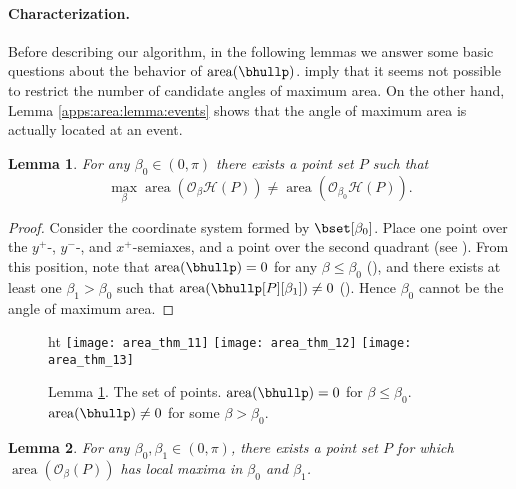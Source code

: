 \documentclass[11pt,letterpaper,english]{article}
\newtheorem{lemma}{Lemma}
\theoremstyle{definition}
\newcommand{\area}{\operatorname{area}}
\begin{document}
\paragraph{Characterization.}

Before describing our algorithm, in the following lemmas we answer
some basic questions about the behavior of
$\area(\bhullp)$. 
imply that it seems not possible to restrict the number of
candidate angles of maximum area. On the other hand, Lemma
\ref{apps:area:lemma:events} shows that the angle of maximum area is
actually located at an event.

\begin{lemma}\label{apps:area:lemma:max_angle}
  For any $\beta_0 \in (0,\pi)$  there exists a point set $P$ such that \[\max_{\beta} \operatorname{area}(\mathcal{O}_\beta\mathcal{H}(P))\neq\operatorname{area}(\mathcal{O}_{\beta_0}\mathcal{H}(P)).\]
\end{lemma}
\begin{proof}
  Consider the coordinate system formed by $\bset[\beta_0]$. Place one
  point over the $y^+$-, $y^-$-, and $x^+$-semiaxes, and a point over
  the second quadrant (see ). From
  this position, note that $\area(\bhullp) = 0$ for any
  $\beta \leq \beta_0$ (), and there
  exists at least one $\beta_1 > \beta_0$ such that
  $\area(\bhullp[P][\beta_1]) \neq 0$
  (). Hence $\beta_0$ cannot be the
  angle of maximum area.
\end{proof}

\begin{figure}[]ht
  \centering
  \subcaptionbox{\label{apps:area:fig:max_angle:1}}
  {\texttt{[image: area\_thm\_11]}}
  \hspace{.5cm}
  \subcaptionbox{\label{apps:area:fig:max_angle:2}}
  {\texttt{[image: area\_thm\_12]}}
  \hspace{.5cm}
  \subcaptionbox{\label{apps:area:fig:max_angle:3}}
  {\texttt{[image: area\_thm\_13]}}
  \caption{Lemma
    \ref{apps:area:lemma:max_angle}. 
    The set of points. 
    $\area(\bhullp) = 0$ for $\beta \leq
    \beta_0$.
     $\area(\bhullp) \neq 0$ for
    some $\beta > \beta_0$.}
  \label{apps:area:fig:max_angle}
\end{figure}

\begin{lemma}\label{apps:area:lemma:bimodal}
  For any $\beta_0,\beta_1 \in (0,\pi)$, there exists a point set $P$ for which $\area(\mathcal{O}_{\beta}(P))$ has local maxima in $\beta_0$ and $\beta_1$.
\end{lemma}
\end{document}
